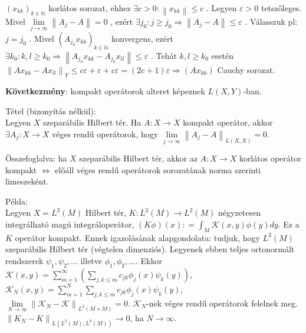 \documentclass[12pt,a4paper]{scrartcl}
\newenvironment{tetel}{}{}
\newenvironment{bizonyitas}{}{}
\newenvironment{pelda}{}{}
\begin{document}
\begin{bizonyitas}
\(\left( x_{kk} \right)_{k \in {\mathbb{N}}}\) korlátos sorozat, ehhez
\(\exists c > 0:\left\| x_{kk} \right\| \leq c\) . Legyen
\(\varepsilon > 0\) tetszőleges. Mivel
\(\lim\limits_{j\rightarrow\infty}\left\| {A_{j} - A} \right\| = 0\) ,
ezért
\(\left. \exists j_{0}:j \geq j_{0}\Rightarrow\left\| {A_{j} - A} \right\| \leq \varepsilon \right.\)
. Válasszuk pl: \(j = j_{0}\) . Mivel
\(\left( {A_{j_{0}}x_{kk}} \right)_{k \in {\mathbb{N}}}\) konvergens,
ezért
\(\left. \exists k_{0}:k,l \geq k_{0}\Rightarrow\left\| {A_{j_{0}}x_{kk} - A_{j_{0}}x_{ll}} \right\| \leq \varepsilon \right.\)
. Tehát \(k,l \geq k_{0}\) esetén
\(\left. \left\| {Ax_{kk} - Ax_{ll}} \right\|_{Y} \leq c\varepsilon + \varepsilon + c\varepsilon = \left( {2c + 1} \right)\varepsilon\Rightarrow\left( {Ax_{kk}} \right) \right.\)
Cauchy sorozat.

\end{bizonyitas}

\textbf{Következmény}: kompakt operátorok alteret képeznek
\(L\left( {X,Y} \right)\)-ban.

\begin{tetel}

Tétel (bizonyítás nélkül):\\
Legyen \(X\) szeparábilis Hilbert tér. Ha
\(\left. A:X\rightarrow X \right.\) kompakt operátor, akkor
\(\left. \exists A_{j}:X\rightarrow X \right.\) véges rendű operátorok,
hogy
\(\lim\limits_{j\rightarrow\infty}\left\| {A_{j} - A} \right\|_{L{({X,X})}} = 0\).

\end{tetel}

Összefoglalva: ha \(X\) szeparábilis Hilbert tér, akkor az
\(\left. A:X\rightarrow X \right.\) korlátos operátor kompakt
\(\Leftrightarrow\) előáll véges rendű operátorok sorozatának norma
szerinti limeszeként.

\begin{pelda}

Példa:\\
Legyen \(X = L^{2}\left( M \right)\) Hilbert tér,
\(\left. K:L^{2}\left( M \right)\rightarrow L^{2}\left( M \right) \right.\)
négyzetesen integrálható magú integráloperátor,
\(\left( {K\phi} \right)\left( x \right): = {\int_{M}{\mathcal{K}\left( {x,y} \right)\phi\left( y \right)dy}}\).
Ez a \(K\) operátor kompakt. Ennek igazolásának alapgondolata: tudjuk,
hogy \(L^{2}\left( M \right)\) szeparábilis Hilbert tér (végtelen
dimenziós). Legyenek ebben teljes ortonormált rendszerek
\(\psi_{1},\psi_{2},...\) illetve \(\phi_{1},\phi_{2},...\). Ekkor
\(\mathcal{K}\left( {x,y} \right) = {\sum\limits_{m = 1}^{\infty}\left( {\sum\limits_{j,k \leq m}{c_{jk}\phi_{j}\left( x \right)\psi_{k}\left( y \right)}} \right)}\),
\(\mathcal{K}_{N}\left( {x,y} \right) = {\sum\limits_{m = 1}^{N}{\sum\limits_{j,k \leq m}{c_{jk}\phi_{j}\left( x \right)\psi_{k}\left( y \right)}}}\),
\(\lim\limits_{N\rightarrow\infty}\left\| {\mathcal{K}_{N} - \mathcal{K}} \right\|_{L^{2}{({M \times M})}} = 0\).
\(\mathcal{K}_{N}\)-nek véges rendű operátorok felelnek meg.
\(\left. \left\| {K_{N} - K} \right\|_{L{({L^{2}{(M)},L^{2}{(M)}})}}\rightarrow 0 \right.\),
ha \(\left. N\rightarrow\infty \right.\).

\end{pelda}
\end{document}
